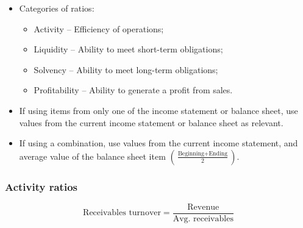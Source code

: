 \documentclass[../notes_compiled.tex]{subfiles}
\begin{document}
\begin{itemize}
\item Categories of ratios:
\begin{itemize}
\item Activity -- Efficiency of operations;
\item Liquidity -- Ability to meet short-term obligations;
\item Solvency -- Ability to meet long-term obligations;
\item Profitability -- Ability to generate a profit from sales.
\end{itemize}

\item If using items from only one of the income statement or balance sheet, use values from the current income statement or balance sheet as relevant.
\item If using a combination, use values from the current income statement, and average value of the balance sheet item $\left( \frac{\text{Beginning} + \text{Ending}}{2} \right)$.
\end{itemize}

\subsubsection{Activity ratios}

\begin{equation*}
\text{Receivables turnover} = \frac{\text{Revenue}}{\text{Avg. receivables}}
\end{equation*}
\end{document}
